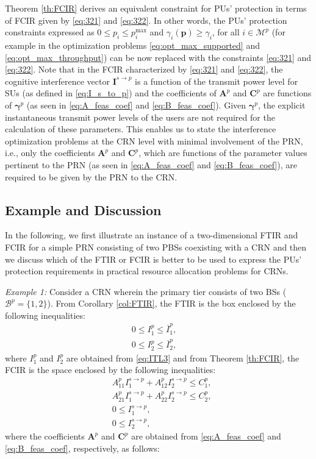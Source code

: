 \documentclass[journal,twoside]{IEEEtran}
\newcommand{\B}{\mathcal{B}}
\newcommand{\M}{\mathcal{M}}
\newcommand{\pimax}{p_i^{\mathrm{max}}}
\newcommand{\pbold}{\mathbf{p}}
\newcommand{\gammai}{\gamma_i}
\newcommand{\gammaihat}{\mathit{\widehat{\gamma}}_i}
\newcommand{\gammabold}{\boldsymbol{\gamma}}
\begin{document}
	Theorem \ref{th:FCIR} derives an equivalent constraint for PUs' protection in terms of FCIR given by \eqref{eq:321} and \eqref{eq:322}.
	In other words, the PUs' protection constraints expressed as  $0\leq p_i \leq \pimax$ and $\gammai(\pbold)\geq \gammaihat$, for all $i\in\M^p$ (for example in the optimization problems \eqref{eq:opt_max_supported} and \eqref{eq:opt_max_throughput}) can be now replaced with the constraints \eqref{eq:321} and \eqref{eq:322}. Note that in the FCIR characterized by \eqref{eq:321} and \eqref{eq:322}, the cognitive interference vector $\mathbf{I}^{s\rightarrow p}$ is a function of the transmit power level for SUs (as defined in \eqref{eq:I_s_to_p}) and the coefficients of $\mathbf{A}^p$ and $\mathbf{C}^p$ are functions of $\gammabold^p$ (as seen in \eqref{eq:A_feas_coef} and \eqref{eq:B_feas_coef}). Given $\gammabold^p$, the explicit instantaneous transmit power levels of the users are not required for the calculation of these parameters. This enables us to state the interference optimization problems at the CRN level with minimal involvement of the PRN, i.e., only the coefficients $\mathbf{A}^p$ and $\mathbf{C}^p$, which are functions of the parameter values pertinent to the PRN (as seen in \eqref{eq:A_feas_coef} and \eqref{eq:B_feas_coef}), are required to be given by the PRN to the CRN. 
	
\subsection{Example and Discussion}
\label{sec:charecterizing_FIR_eg_disc}
	In the following, we first illustrate an instance of a two-dimensional FTIR and FCIR for a simple PRN consisting of two PBSs coexisting with a CRN and then we discuss which of the FTIR or FCIR is better to be used to express the PUs' protection requirements in practical resource allocation problems for CRNs. 
	
	\emph{Example 1:} Consider a CRN wherein the primary tier consists of two BSs ($\B^{p}=\{1,2\}$). From Corollary \ref{col:FTIR}, the FTIR is the box enclosed by the following inequalities:
	\begin{align}
		0\leq I^p_1 \leq \overline{I}^p_1, \quad  \nonumber \\
		0\leq I^p_2 \leq \overline{I}^p_2, \quad  \nonumber 
	\end{align}
	where $I^p_1$ and $I^p_2$ are obtained from \eqref{eq:ITL3} and from Theorem \ref{th:FCIR}, the FCIR is the space enclosed by the following inequalities:
	\begin{align}
		& A_{11}^p I^{s \rightarrow p}_1 + A_{12}^p I^{s \rightarrow p}_2 \leq C_1^p, \nonumber \\
		& A_{21}^p I^{s \rightarrow p}_1 + A_{22}^p I^{s \rightarrow p}_2 \leq C_2^p, \nonumber \\
		& 0 \leq I^{s \rightarrow p}_1,	\nonumber \\
		& 0 \leq I^{s \rightarrow p}_2,	\nonumber
	\end{align}
	where the coefficients $\mathbf{A}^p$ and $\mathbf{C}^p$ are obtained from \eqref{eq:A_feas_coef} and \eqref{eq:B_feas_coef}, respectively, as follows:
	
\end{document}
